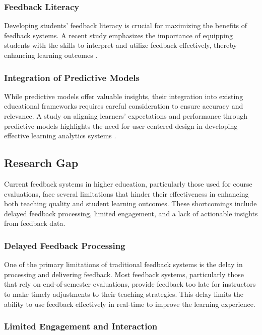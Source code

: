 \documentclass[conference]{IEEEtran}
\begin{document}
\subsubsection{Feedback Literacy}

Developing students' feedback literacy is crucial for maximizing the benefits of feedback systems. A recent study emphasizes the importance of equipping students with the skills to interpret and utilize feedback effectively, thereby enhancing learning outcomes \cite{Nieminen2023}.

\subsubsection{Integration of Predictive Models}

While predictive models offer valuable insights, their integration into existing educational frameworks requires careful consideration to ensure accuracy and relevance. A study on aligning learners' expectations and performance through predictive models highlights the need for user-centered design in developing effective learning analytics systems \cite{bdcc8120187}.

\subsection{Research Gap}

Current feedback systems in higher education, particularly those used for course evaluations, face several limitations that hinder their effectiveness in enhancing both teaching quality and student learning outcomes. These shortcomings include delayed feedback processing, limited engagement, and a lack of actionable insights from feedback data.

\subsubsection{Delayed Feedback Processing}

One of the primary limitations of traditional feedback systems is the delay in processing and delivering feedback. Most feedback systems, particularly those that rely on end-of-semester evaluations, provide feedback too late for instructors to make timely adjustments to their teaching strategies. This delay limits the ability to use feedback effectively in real-time to improve the learning experience.

\subsubsection{Limited Engagement and Interaction}
\end{document}

